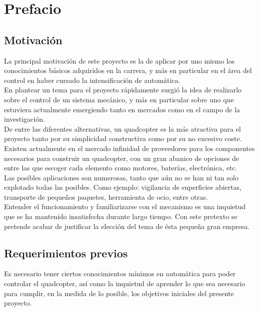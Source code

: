 \documentclass[twoside,11pt]{report}
\begin{document}
\chapter{Prefacio} \label{prefacio}
\section{Motivación}

La principal motivación de este proyecto es la de aplicar por uno mismo los conocimientos básicos adquiridos en la carrera, y más en particular en el área del control en haber cursado la intensificación de automática.\\

En plantear un tema para el proyecto rápidamente surgió la idea de realizarlo sobre el control de un sistema mecánico, y más en particular sobre uno que estuviera actualmente emergiendo tanto en mercados como en el campo de la investigación.\\ 

De entre las diferentes alternativas, un quadcopter es la más atractiva para el proyecto tanto por su simplicidad constructiva como por su no excesivo coste. Existen actualmente en el mercado infinidad de proveedores para los componentes necesarios para construir un quadcopter, con un gran abanico de opciones de entre las que escoger cada elemento como motores, baterías, electrónica, etc.\\

Las posibles aplicaciones son numerosas, tanto que aún no se han ni tan solo explotado todas las posibles. Como ejemplo: vigilancia de superficies abiertas, transporte de pequeños paquetes, herramienta de ocio, entre otras.\\

Entender el funcionamiento y familiarizarse con el mecanismo es una inquietud que se ha mantenido insatisfecha durante largo tiempo. Con este pretexto se pretende acabar de justificar la elección del tema de ésta pequeña gran empresa.

\section{Requerimientos previos}

Es necesario tener ciertos conocimientos mínimos en automática para poder controlar el quadcopter, así como la inquietud de aprender lo que sea necesario para cumplir, en la medida de lo posible, los objetivos iniciales del presente proyecto. \\
\end{document}
